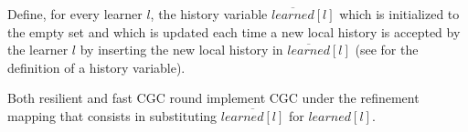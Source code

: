 \documentclass{llncs}
\begin{document}
Define, for every learner $l$, the history variable $\overline{learned}\left[ l \right]$ which is initialized to the empty set and which is
updated each time a new local history is accepted by the learner $l$ by
inserting the new local history in $\overline{learned}\left[ l \right]$ (see \cite{AbadiLamport91ExistenceRefinementMappings} for the
definition of a history variable).
\begin{theorem}
  \label{thm:rounds}
    Both resilient and fast CGC round implement CGC under the refinement
    mapping that consists in substituting $\overline{learned\left[ l \right]}$
    for $learned\left[ l \right]$.
\end{theorem}


\begin{comment}
\section{Examples of Concrete CGC Algorithms}
\label{sec:examples}

In this section we show how to modify the rounds of Classic Paxos,
Multi-Coordinated Paxos, Chain Replication, Ring Paxos, and Fast Paxos to obtain
CGC round. \Cref{thm:comp} then guarantee that all those different types of
rounds can be used in the same algorithm to yield an implementation of Chain
Agreement.

\subsection{Classic Paxos}

The rounds of the Classic Paxos algorithm can be modified so as to
obtain an implementation of resilient CGC round.  We define
Classic Paxos CGC round by specializing the specification of
resilient CGC round, giving a concrete protocol for disseminating
the proposed commands to the acceptors and enforcing that the learned
histories form a chain.

Each Classic Paxos round has a unique leader among the acceptors which
centrally orders the proposed commands, which are accepted by the
other acceptors in the order determined by the leader.  This protocol
ensures that every local acceptor history is a prefix of the local
history of the leader, therefore guaranteeing that the local acceptor histories
forming a chain.

Acceptor broadcast each newly accepted history to the learners, which
learn a history $h$ when they receive enough extensions of $h$ from the
acceptors.  When instructed by the scheduling policy to abort, a
switcher sends a stop message to the acceptors, which irrevocably stop
updating their local history and send back to the switcher an
acknowledgement containing their local history. A switcher
determines an abort history once it has received acknowledgments from
an abort quorum of acceptors $R$, using the operator $SafeAborts\left(
R \right)$.


\end{comment}
\end{document}
